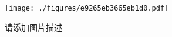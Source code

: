 
\begin{figure}[ht]
\centering
\texttt{[image: ./figures/e9265eb3665eb1d0.pdf]}
\caption{请添加图片描述} \label{fig_test20_1}
\end{figure}
